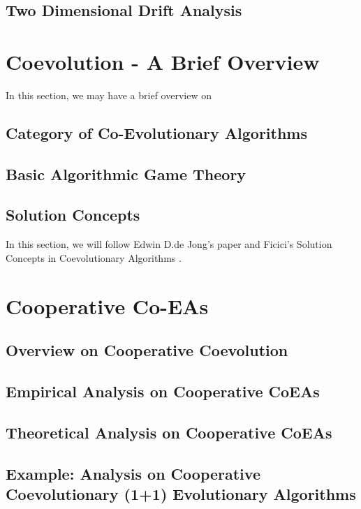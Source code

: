 \documentclass[a4paper,11pt]{report}
\theoremstyle{plain} %
\theoremstyle{definition} %
\theoremstyle{remark} %
\begin{document}
\section{Two Dimensional Drift Analysis}

\chapter{Coevolution - A Brief Overview}
In this section, we may have a brief overview on 

\section{Category of Co-Evolutionary Algorithms}

\section{Basic Algorithmic Game Theory}

\section{Solution Concepts} 
In this section, we will follow Edwin D.de Jong's paper \citep{kanade_incremental_2004} and Ficici's Solution Concepts in Coevolutionary Algorithms \citep{ficici_solution_nodate}.


\chapter{Cooperative Co-EAs}

\section{Overview on Cooperative Coevolution}

\section{Empirical Analysis on Cooperative CoEAs}


\section{Theoretical Analysis on Cooperative CoEAs}

\section{Example: Analysis on Cooperative Coevolutionary (1+1) Evolutionary Algorithms}
\end{document}
